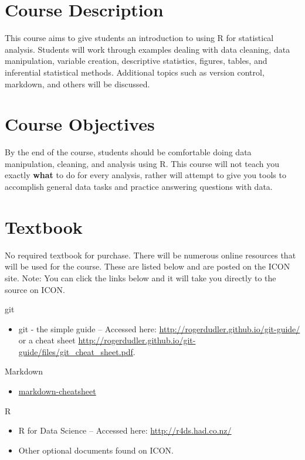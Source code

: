\documentclass[11pt,article,oneside]{memoir}
\begin{document}




%
%

\section*{Course Description}
This course aims to give students an introduction to using R for statistical analysis. Students will work through examples dealing with data cleaning, data manipulation, variable creation, descriptive statistics, figures, tables, and inferential statistical methods. Additional topics such as version control, markdown, and others will be discussed.

\section*{Course Objectives}
By the end of the course, students should be comfortable doing data manipulation, cleaning, and analysis using R. This course will not teach you exactly \textbf{what} to do for every analysis, rather will attempt to give you tools to accomplish general data tasks and practice answering questions with data.

\section*{Textbook}
No required textbook for purchase. There will be numerous online resources that will be used for the course. These are listed below and are posted on the ICON site. Note: You can click the links below and it will take you directly to the source on ICON.

\begin{resource}{git \hspace{.075in}}
  \begin{itemize}
   \item git - the simple guide -- Accessed here: \url{http://rogerdudler.github.io/git-guide/} or a cheat sheet \url{http://rogerdudler.github.io/git-guide/files/git_cheat_sheet.pdf}.
  \end{itemize}
\end{resource}
\begin{resource}{Markdown}
  \begin{itemize}
   \item \href{https://uiowa.instructure.com/courses/73415/files/5639192/download?wrap=1}{markdown-cheatsheet}
  \end{itemize}
\end{resource}
\begin{resource}{R \hspace{.2in}}
  \begin{itemize}
   \item R for Data Science -- Accessed here: \url{http://r4ds.had.co.nz/}
   \item Other optional documents found on ICON.
  \end{itemize}
\end{resource}
\end{document}
